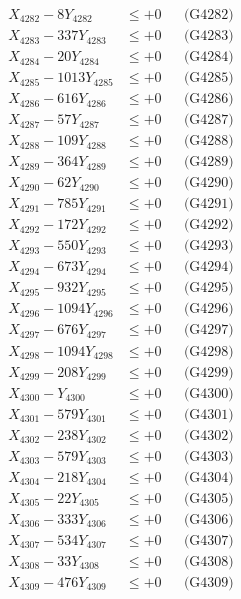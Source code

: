 \documentclass[a4paper,10pt]{article}
\begin{document}
{\begin{align}
X_{4282} - 8Y_{4282} &\leq +0 && \text{(G4282)} \\
X_{4283} - 337Y_{4283} &\leq +0 && \text{(G4283)} \\
X_{4284} - 20Y_{4284} &\leq +0 && \text{(G4284)} \\
X_{4285} - 1013Y_{4285} &\leq +0 && \text{(G4285)} \\
X_{4286} - 616Y_{4286} &\leq +0 && \text{(G4286)} \\
X_{4287} - 57Y_{4287} &\leq +0 && \text{(G4287)} \\
X_{4288} - 109Y_{4288} &\leq +0 && \text{(G4288)} \\
X_{4289} - 364Y_{4289} &\leq +0 && \text{(G4289)} \\
X_{4290} - 62Y_{4290} &\leq +0 && \text{(G4290)} \\
\allowbreak
X_{4291} - 785Y_{4291} &\leq +0 && \text{(G4291)} \\
X_{4292} - 172Y_{4292} &\leq +0 && \text{(G4292)} \\
X_{4293} - 550Y_{4293} &\leq +0 && \text{(G4293)} \\
X_{4294} - 673Y_{4294} &\leq +0 && \text{(G4294)} \\
X_{4295} - 932Y_{4295} &\leq +0 && \text{(G4295)} \\
X_{4296} - 1094Y_{4296} &\leq +0 && \text{(G4296)} \\
X_{4297} - 676Y_{4297} &\leq +0 && \text{(G4297)} \\
X_{4298} - 1094Y_{4298} &\leq +0 && \text{(G4298)} \\
X_{4299} - 208Y_{4299} &\leq +0 && \text{(G4299)} \\
X_{4300} - Y_{4300} &\leq +0 && \text{(G4300)} \\
\allowbreak
X_{4301} - 579Y_{4301} &\leq +0 && \text{(G4301)} \\
X_{4302} - 238Y_{4302} &\leq +0 && \text{(G4302)} \\
X_{4303} - 579Y_{4303} &\leq +0 && \text{(G4303)} \\
X_{4304} - 218Y_{4304} &\leq +0 && \text{(G4304)} \\
X_{4305} - 22Y_{4305} &\leq +0 && \text{(G4305)} \\
X_{4306} - 333Y_{4306} &\leq +0 && \text{(G4306)} \\
X_{4307} - 534Y_{4307} &\leq +0 && \text{(G4307)} \\
X_{4308} - 33Y_{4308} &\leq +0 && \text{(G4308)} \\
X_{4309} - 476Y_{4309} &\leq +0 && \text{(G4309)} \\

\end{align}}
\end{document}
